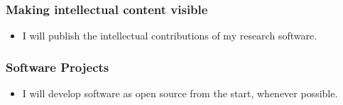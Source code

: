 \documentclass[a4paper,UKenglish]{dagman}
\renewcommand{\paragraph}[1]{\subsubsection*{#1}\xspace}
\begin{document}
\paragraph{Making intellectual content visible}
\begin{itemize}
\item I will publish the intellectual contributions of my research software.


\end{itemize}

\paragraph{Software Projects}
\begin{itemize}
\item I will develop software as open source from the start, whenever possible.


\end{itemize}

\end{document}
